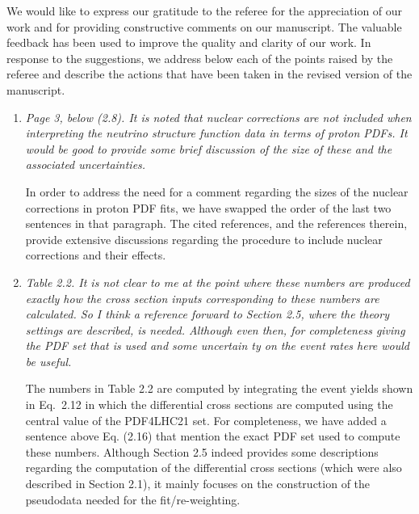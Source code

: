 \documentclass[11pt,a4paper]{article}
\begin{document}
	
\noindent
We would like to express our gratitude to the referee for the appreciation
of our work and for providing constructive
comments on our manuscript. The valuable feedback has been used to
improve the quality and clarity of our work.
%
In response to the suggestions, we address below each of the points raised by 
the referee and describe the actions that have been taken
in the revised version of the manuscript.

\noindent

\begin{enumerate}
	\item {\it Page 3, below (2.8). It is noted that nuclear corrections are not included when 
		interpreting the neutrino structure function data in terms of proton PDFs. It would be good
		to provide some brief discussion of the size of these and the associated uncertainties.
	}
	
	In order to address the need for a comment regarding the sizes of the nuclear corrections
	in proton PDF fits, we have swapped the order of the last two sentences in that paragraph.
	The cited references, and the references therein, provide extensive discussions regarding
	the procedure to include nuclear corrections and their effects.
	
	\item {\it Table 2.2. It is not clear to me at the point where these numbers are produced exactly
		how the cross section inputs corresponding to these numbers are calculated. So I
		think a reference forward to Section 2.5, where the theory settings are described, is
		needed. Although even then, for completeness giving the PDF set that is used and
		some uncertain
		ty on the event rates here would be useful.
	}
	
	The numbers in Table 2.2 are computed by integrating the event yields shown in Eq.~2.12 in
	which the differential cross sections are computed using the central value of the PDF4LHC21
	set. For completeness, we have added a sentence above Eq. (2.16) that mention the exact
	PDF set used to compute these numbers. Although
	Section 2.5 indeed provides some descriptions regarding the computation of the differential cross sections
	(which were also described in Section 2.1), it mainly focuses on the construction of the pseudodata
	needed for the fit/re-weighting.
	

\end{enumerate}
\end{document}
